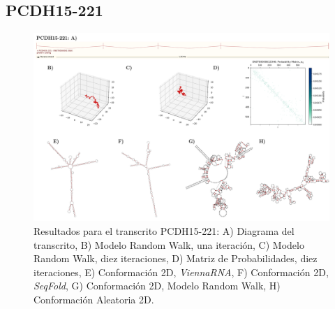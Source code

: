 \documentclass[a4paper,11pt,titlepage]{article}
\theoremstyle{definition}
\begin{document}
\subsection*{PCDH15-221}\label{subsec:gene2}

\begin{figure}[H]
    \centering
    \includegraphics[width=\textwidth]{images/PCDH15-221_full.png}
    \small{\caption{Resultados para el transcrito PCDH15-221: A) Diagrama del transcrito, B) Modelo Random Walk, una iteración, C) Modelo Random Walk, diez iteraciones, D) Matriz de Probabilidades, diez iteraciones, E) Conformación 2D, \textit{ViennaRNA}, F) Conformación 2D, \textit{SeqFold}, G) Conformación 2D, Modelo Random Walk, H) Conformación Aleatoria 2D.}\label{fig:PCDH15-221-diag}}\normalsize
\end{figure}
\end{document}
